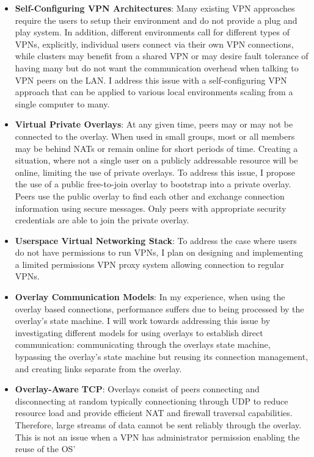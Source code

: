 \begin{itemize}
\item \textbf{Self-Configuring VPN Architectures}: Many existing VPN approaches
require the users to setup their environment and do not provide a plug and play
system.  In addition, different environments call for different types of VPNs,
explicitly, individual users connect via their own VPN connections, while
clusters may benefit from a shared VPN or may desire fault tolerance of having
many but do not want the communication overhead when talking to VPN peers on
the LAN.  I address this issue with a self-configuring VPN approach that can be
applied to various local environments scaling from a single computer to many.
\item \textbf{Virtual Private Overlays}:  At any given time, peers may or may
not be connected to the overlay.  When used in small groups, most or all
members may be behind NATs or remain online for short periods of time.  Creating
a situation, where not a single user on a publicly addressable resource will be
online, limiting the use of private overlays.  To address this issue, I propose
the use of a public free-to-join overlay to bootstrap into a private overlay.
Peers use the public overlay to find each other and exchange connection
information using secure messages.  Only peers with appropriate security
credentials are able to join the private overlay.
\item \textbf{Userspace Virtual Networking Stack}: To address the case where
users do not have permissions to run VPNs, I plan on designing and implementing
a limited permissions VPN proxy system allowing connection to regular VPNs.
\item \textbf{Overlay Communication Models}: In my experience, when using the
overlay based connections, performance suffers due to being processed by the
overlay's state machine.  I will work towards addressing this issue by
investigating different models for using overlays to establish direct
communication:  communicating through the overlays state machine, bypassing the
overlay's state machine but reusing its connection management, and creating
links separate from the overlay.
\item \textbf{Overlay-Aware TCP}: Overlays consist of peers connecting and
disconnecting at random typically connectioning through UDP to reduce resource
load and provide efficient NAT and firewall traversal capabilities.  Therefore,
large streams of data cannot be sent reliably through the overlay.  This is not
an issue when a VPN has administrator permission enabling the reuse of the OS'

\end{itemize}
